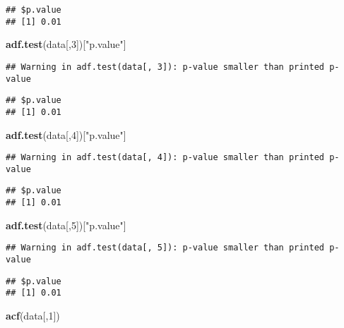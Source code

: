 \documentclass[
]{article}
\newenvironment{Shaded}{\begin{snugshade}}{\end{snugshade}}
\newcommand{\DecValTok}[1]{\textcolor[rgb]{0.00,0.00,0.81}{#1}}
\newcommand{\KeywordTok}[1]{\textcolor[rgb]{0.13,0.29,0.53}{\textbf{#1}}}
\newcommand{\NormalTok}[1]{#1}
\newcommand{\StringTok}[1]{\textcolor[rgb]{0.31,0.60,0.02}{#1}}
\begin{document}
\begin{verbatim}
## $p.value
## [1] 0.01
\end{verbatim}

\begin{Shaded}
\begin{Highlighting}[]
\KeywordTok{adf.test}\NormalTok{(data[,}\DecValTok{3}\NormalTok{])[}\StringTok{"p.value"}\NormalTok{]}
\end{Highlighting}
\end{Shaded}

\begin{verbatim}
## Warning in adf.test(data[, 3]): p-value smaller than printed p-value
\end{verbatim}

\begin{verbatim}
## $p.value
## [1] 0.01
\end{verbatim}

\begin{Shaded}
\begin{Highlighting}[]
\KeywordTok{adf.test}\NormalTok{(data[,}\DecValTok{4}\NormalTok{])[}\StringTok{"p.value"}\NormalTok{]}
\end{Highlighting}
\end{Shaded}

\begin{verbatim}
## Warning in adf.test(data[, 4]): p-value smaller than printed p-value
\end{verbatim}

\begin{verbatim}
## $p.value
## [1] 0.01
\end{verbatim}

\begin{Shaded}
\begin{Highlighting}[]
\KeywordTok{adf.test}\NormalTok{(data[,}\DecValTok{5}\NormalTok{])[}\StringTok{"p.value"}\NormalTok{]}
\end{Highlighting}
\end{Shaded}

\begin{verbatim}
## Warning in adf.test(data[, 5]): p-value smaller than printed p-value
\end{verbatim}

\begin{verbatim}
## $p.value
## [1] 0.01
\end{verbatim}

\begin{Shaded}
\begin{Highlighting}[]
\KeywordTok{acf}\NormalTok{(data[,}\DecValTok{1}\NormalTok{])}
\end{Highlighting}
\end{Shaded}
\end{document}
